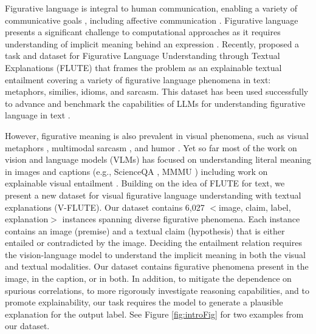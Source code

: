 Figurative language is integral to human communication, enabling a variety of communicative goals \cite{doi:10.1111/j.1467-9280.1994.tb00653.x}, including affective communication \cite{fussell2014figurative}. Figurative language 
presents a significant challenge to computational approaches as it requires understanding of implicit meaning behind an expression \cite{stowe-etal-2022-impli, shutova2011computational, veale2016metaphor, zhou-etal-2021-pie}. 
Recently, \citet{chakrabarty-etal-2022-flute} proposed a task and dataset for Figurative Language Understanding through Textual Explanations (FLUTE) that frames the problem as an explainable textual entailment covering a variety of figurative language phenomena in text: metaphors, similies, idioms, and sarcasm. This dataset has been used successfully to advance and benchmark the capabilities of LLMs for understanding figurative language in text \cite{saakyan2022report,ziems2024can,sravanthi2024pub, dey2024socialite}. 

However, figurative meaning is also prevalent in visual phenomena, such as visual metaphors \cite{akula2023metaclue, chakrabarty-etal-2023-spy}, multimodal sarcasm \cite{desai2022nice}, and humor \cite{hessel-etal-2023-androids, hwang-shwartz-2023-memecap}. Yet so far most of the work on vision and language models (VLMs) has focused on understanding literal meaning in images and captions (e.g., ScienceQA \cite{lu2022learn}, MMMU \cite{yue2023mmmu}) including work on explainable visual entailment \cite{kayser2021vil}. Building on the idea of FLUTE \cite{chakrabarty-etal-2022-flute} for text, we present a new dataset for visual figurative language understanding with textual explanations (V-FLUTE). Our dataset contains 6,027 $<$image, claim, label, explanation$>$ instances spanning diverse figurative phenomena.
Each instance contains an image (premise) and a textual claim (hypothesis) that is either entailed or contradicted by the image. Deciding the entailment relation requires the vision-language model to understand the implicit meaning in both the visual and textual modalities. Our dataset contains figurative phenomena present in the image, in the caption, or in both. In addition, to mitigate the dependence on spurious correlations, to more rigorously investigate reasoning capabilities, and to promote explainability, our task requires the model to generate a plausible explanation for the output label. See Figure \ref{fig:introFig} for two examples from our dataset. 

